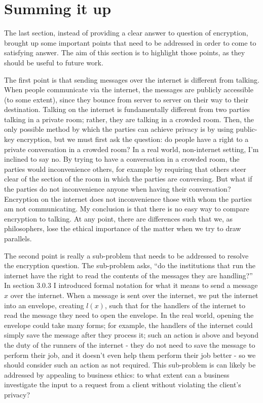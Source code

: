 \documentclass[11pt]{article}
\begin{document}
\section{Summing it up}
The last section, instead of providing a clear answer to question of encryption, brought up some important points that need to be addressed in order to come to satisfying answer.
The aim of this section is to highlight those points, as they should be useful to future work.

The first point is that sending messages over the internet is different from talking.
When people communicate via the internet, the messages are publicly accessible (to some extent), since they bounce from server to server on their way to their destination.
Talking on the internet is fundamentally different from two parties talking in a private room; rather, they are talking in a crowded room.
Then, the only possible method by which the parties can achieve privacy is by using public-key encryption, but we must first ask the question: do people have a right to a private conversation in a crowded room? 
In a real world, non-internet setting, I'm inclined to say no. 
By trying to have a conversation in a crowded room, the parties would inconvenience others, for example by requiring that others steer clear of the section of the room in which the parties are conversing.
But what if the parties do not inconvenience anyone when having their conversation?
Encryption on the internet does not inconvenience those with whom the parties am not communicating.
My conclusion is that there is no easy way to compare encryption to talking.
At any point, there are differences such that we, as philosophers, lose the ethical importance of the matter when we try to draw parallels.

The second point is really a sub-problem that needs to be addressed to resolve the encryption question.
The sub-problem asks, ``do the institutions that run the internet have the right to read the contents of the messages they are handling?''
In section 3.0.3 I introduced formal notation for what it means to send a message $x$ over the internet.
When a message is sent over the internet, we put the internet into an envelope, creating $l(x)$, such that for the handlers of the internet to read the message they need to open the envelope.
In the real world, opening the envelope could take many forms; for example, the handlers of the internet could simply save the message after they process it; such an action is above and beyond the duty of the runners of the internet - they do not need to save the message to perform their job, and it doesn't even help them perform their job better - so we should consider such an action as not required.
This sub-problem is can likely be addressed by appealing to business ethics: to what extent can a business investigate the input to a request from a client without violating the client's privacy?
\end{document}
